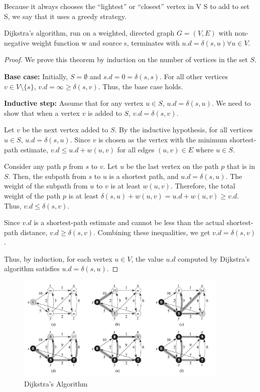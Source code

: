 Because it always chooses the “lightest” or “closest” vertex
in V S to add to set S, we say that it uses a greedy strategy.

\begin{theorem}
    Dijkstra’s algorithm, run on a weighted, directed graph $G = (V, E)$ with non-negative weight function w and source s, terminates with $u.d = \delta(s, u) \forall u \in V$.
\end{theorem}
\begin{proof}
    We prove this theorem by induction on the number of vertices in the set $S$.

    \textbf{Base case:} Initially, $S = \emptyset$ and $s.d = 0 = \delta(s, s)$. For all other vertices $v \in V \setminus \{s\}$, $v.d = \infty \geq \delta(s, v)$. Thus, the base case holds.

    \textbf{Inductive step:} Assume that for any vertex $u \in S$, $u.d = \delta(s, u)$. We need to show that when a vertex $v$ is added to $S$, $v.d = \delta(s, v)$.

    Let $v$ be the next vertex added to $S$. By the inductive hypothesis, for all vertices $u \in S$, $u.d = \delta(s, u)$. Since $v$ is chosen as the vertex with the minimum shortest-path estimate, $v.d \leq u.d + w(u, v)$ for all edges $(u, v) \in E$ where $u \in S$.

    Consider any path $p$ from $s$ to $v$. Let $u$ be the last vertex on the path $p$ that is in $S$. Then, the subpath from $s$ to $u$ is a shortest path, and $u.d = \delta(s, u)$. The weight of the subpath from $u$ to $v$ is at least $w(u, v)$. Therefore, the total weight of the path $p$ is at least $\delta(s, u) + w(u, v) = u.d + w(u, v) \geq v.d$. Thus, $v.d \leq \delta(s, v)$.

    Since $v.d$ is a shortest-path estimate and cannot be less than the actual shortest-path distance, $v.d \geq \delta(s, v)$. Combining these inequalities, we get $v.d = \delta(s, v)$.

    Thus, by induction, for each vertex $u \in V$, the value $u.d$ computed by Dijkstra's algorithm satisfies $u.d = \delta(s, u)$.
\end{proof}

\begin{figure}[H]
    \centering
    \includegraphics[width=0.9\textwidth]{assets/dijkstra.png}
    \caption{Dijkstra's Algorithm}
    \label{fig:dijkstra}
\end{figure}

